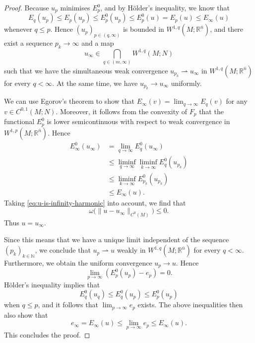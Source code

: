 \documentclass[a4paper]{article}
\newcommand{\R}{\mathbb{R}}
\newcommand{\N}{\mathbb{N}}
\newcommand{\ndim}{{\bar{n}}}
\theoremstyle{definition}
\theoremstyle{remark}
\begin{document}
\begin{proof}
Because $u_p$ minimises $E_p^0$, and by H\"older's inequality, we know that
\[
E_q(u_p) \le E_p(u_p) \le E_p^0(u_p) \le E_p^0(u) = E_p(u) \le E_\infty(u)
\]
whenever $q \le p$. Hence $(u_p)_{p \in (q, \infty)}$ is bounded in $W^{1, q}(M; \R^\ndim)$, and there exist a sequence $p_k \to \infty$ and a map
\[
u_\infty \in \bigcap_{q \in (m, \infty)} W^{1, q}(M; N)
\]
such that we have the simultaneous weak convergence $u_{p_k} \rightharpoonup u_\infty$
in $W^{1, q}(M; \R^\ndim)$ for every $q < \infty$.
At the same time, we have $u_{p_k} \to u_\infty$ uniformly.

We can use Egorov's theorem to show that $E_\infty(v) = \lim_{q \to \infty} E_q(v)$
for any $v \in C^{0, 1}(M; N)$. Moreover, it follows from the convexity of
$F_p$ that the functional $E_p^0$ is lower
semicontinuous with respect to weak convergence in $W^{1, p}(M; \R^\ndim)$.
Hence
\[
\begin{split}
E_\infty^0(u_\infty) & = \lim_{q \to \infty} E_q^0(u_\infty) \\
& \le \liminf_{q \to \infty} \liminf_{k \to \infty} E_q^0(u_{p_k}) \\
& \le \liminf_{k \to \infty} E_{p_k}^0(u_{p_k}) \\
& \le E_\infty(u).
\end{split}
\]
Taking \eqref{eq:u-is-infinity-harmonic} into account, we find that
\[
\omega\bigl(\|u - u_\infty\|_{C^0(M)}\bigr) \le 0.
\]
Thus $u = u_\infty$.

Since this means that we have a unique limit independent of the sequence $(p_k)_{k \in \N}$, we conclude that $u_p \rightharpoonup u$ weakly in
$W^{1, q}(M; \R^\ndim)$ for every $q < \infty$. Furthermore, we obtain the uniform convergence
$u_p \to u$. Hence
\[
\lim_{p \to \infty} \left(E_p^0(u_p) - e_p\right) = 0.
\]
H\"older's inequality implies that
\[
E_q^0(u_q) \le E_q^0(u_p) \le E_p^0(u_p)
\]
when $q \le p$, and it follows that $\lim_{p \to \infty} e_p$ exists.
The above inequalities then also show that
\[
e_\infty = E_\infty(u) \le \lim_{p \to \infty} e_p \le E_\infty(u).
\]
This concludes the proof.
\end{proof}
\end{document}

